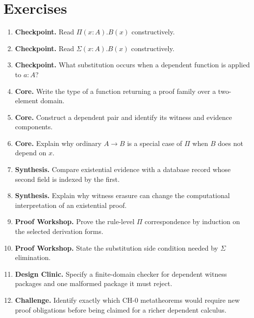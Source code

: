 \section*{Exercises}
\begin{enumerate}[label=\textbf{6.\arabic*.}]
\item \textbf{Checkpoint.} Read $\Pi(x:A).B(x)$ constructively.
\item \textbf{Checkpoint.} Read $\Sigma(x:A).B(x)$ constructively.
\item \textbf{Checkpoint.} What substitution occurs when a dependent function is applied to $a:A$?
\item \textbf{Core.} Write the type of a function returning a proof family over a two-element domain.
\item \textbf{Core.} Construct a dependent pair and identify its witness and evidence components.
\item \textbf{Core.} Explain why ordinary $A\to B$ is a special case of $\Pi$ when $B$ does not depend on $x$.
\item \textbf{Synthesis.} Compare existential evidence with a database record whose second field is indexed by the first.
\item \textbf{Synthesis.} Explain why witness erasure can change the computational interpretation of an existential proof.
\item \textbf{Proof Workshop.} Prove the rule-level $\Pi$ correspondence by induction on the selected derivation forms.
\item \textbf{Proof Workshop.} State the substitution side condition needed by $\Sigma$ elimination.
\item \textbf{Design Clinic.} Specify a finite-domain checker for dependent witness packages and one malformed package it must reject.
\item \textbf{Challenge.} Identify exactly which $\mathrm{CH}\text{-}0$ metatheorems would require new proof obligations before being claimed for a richer dependent calculus.
\end{enumerate}
